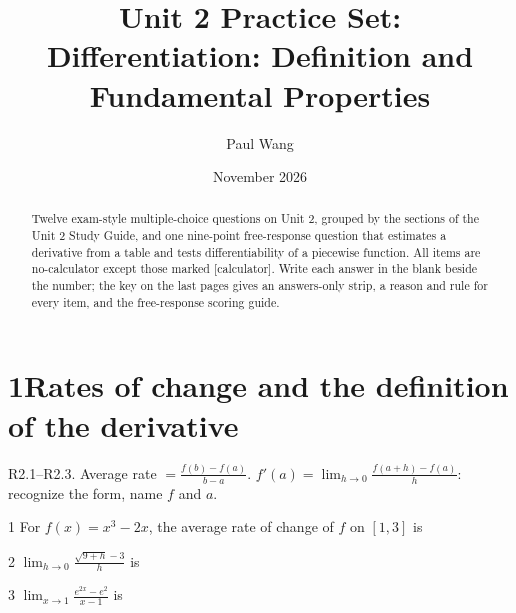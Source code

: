 \documentclass{apcalc}
\title{Unit 2 Practice Set: Differentiation: Definition and Fundamental Properties}
\author{Paul Wang}
\date{November 2026}
\begin{document}
\maketitle
\begin{abstract}
Twelve exam-style multiple-choice questions on Unit 2, grouped by the sections of the Unit 2 Study Guide, and one nine-point free-response question that estimates a derivative from a table and tests differentiability of a piecewise function. All items are no-calculator except those marked [calculator]. Write each answer in the blank beside the number; the key on the last pages gives an answers-only strip, a reason and rule for every item, and the free-response scoring guide.
\end{abstract}
\section*{1\quad Rates of change and the definition of the derivative}
\begin{setrule}R2.1–R2.3. Average rate $=\frac{f(b)-f(a)}{b-a}$. $f'(a)=\lim_{h\to0}\frac{f(a+h)-f(a)}{h}$: recognize the form, name $f$ and $a$.\end{setrule}
\begin{q}{1}
For $f(x)=x^3-2x$, the average rate of change of $f$ on $[1,3]$ is
\end{q}
\begin{q}{2}
$\displaystyle\lim_{h\to0}\frac{\sqrt{9+h}-3}{h}$ is
\end{q}
\begin{q}{3}
$\displaystyle\lim_{x\to1}\frac{e^{2x}-e^2}{x-1}$ is
\end{q}
\end{document}
